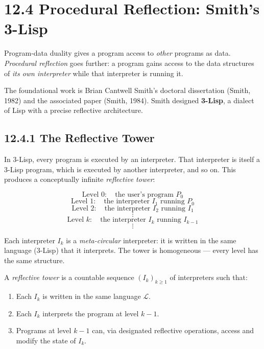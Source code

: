 \section{12.4 Procedural Reflection: Smith's 3-Lisp}

Program-data duality gives a program access to \textit{other} programs as data. \textit{Procedural reflection} goes further: a program gains access to the data structures of \textit{its own interpreter} while that interpreter is running it.

The foundational work is Brian Cantwell Smith's doctoral dissertation (Smith, 1982) and the associated paper (Smith, 1984). Smith designed \textbf{3-Lisp}, a dialect of Lisp with a precise reflective architecture.

\subsection{12.4.1 The Reflective Tower}

In 3-Lisp, every program is executed by an interpreter. That interpreter is itself a 3-Lisp program, which is executed by another interpreter, and so on. This produces a conceptually infinite \textit{reflective tower}:

\[
\text{Level } 0: \quad \text{the user's program } P_0
\]
\[
\text{Level } 1: \quad \text{the interpreter } I_1 \text{ running } P_0
\]
\[
\text{Level } 2: \quad \text{the interpreter } I_2 \text{ running } I_1
\]
\[
\vdots
\]
\[
\text{Level } k: \quad \text{the interpreter } I_k \text{ running } I_{k-1}
\]
\[
\vdots
\]

Each interpreter $I_k$ is a \textit{meta-circular} interpreter: it is written in the same language (3-Lisp) that it interprets. The tower is homogeneous --- every level has the same structure.

\begin{definition}
A \textit{reflective tower} is a countable sequence $(I_k)_{k \geq 1}$ of interpreters such that:
\end{definition}

\begin{enumerate}
  \item Each $I_k$ is written in the same language $\mathcal{L}$.
  \item Each $I_k$ interprets the program at level $k - 1$.
  \item Programs at level $k - 1$ can, via designated reflective operations, access and modify the state of $I_k$.
\end{enumerate}

